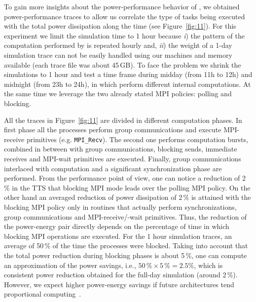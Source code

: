 To gain more insights about the power-performance behavior of \cosmoart, we obtained power-per\-for\-man\-ce traces to allow us correlate the type of tasks being executed with the total power dissipation along the time (see Figure~\ref{fig:11}). For this experiment we limit the simulation time to 1 hour because \emph{i}) the pattern of the computation performed by \cosmoart is repeated hourly and, \emph{ii}) the weight of a 1-day simulation trace can not be easily handled using our machines and memory available (each trace file was about 45\,GB). To face the problem we shrink the simulations to 1 hour and test a time frame during midday (from 11h to 12h) and  midnight (from 23h to 24h), in which \cosmoart perform different internal computations. At the same time we leverage the two already stated MPI policies: polling and blocking. 

All the traces in Figure~\ref{fig:11} are divided in different computation phases. In first phase all the processes perform group communications and execute MPI-receive primitives (e.g. \texttt{MPI\_Recv}). The second one performs computation bursts, combined in between with group communications, blocking sends, immediate receives and MPI-wait primitives are executed. Finally, group communications interlaced with computation and a significant synchronization phase are performed. From the performance point of view, one can notice a reduction of 2\,\% in the TTS that blocking MPI mode leads over the polling MPI policy. On the other hand an averaged reduction of power dissipation of 2\,\% is attained with the blocking MPI policy only in routines that actually perform synchronizations, group communications and MPI-receive/-wait primitives. Thus, the reduction of the power-energy pair directly depends on the percentage of time in which blocking MPI operations are executed. For the 1 hour simulation traces, an average of 50\,\% of the time the processes were blocked. Taking into account that  the total power reduction during blocking phases is about 5\,\%, one can compute an approximation of the power savings, i.e., $50\,\% \times 5\,\% = 2.5\%$, which is consistent power reduction obtained for the full-day simulation (around 2\,\%). However, we expect higher power-energy savings if future architectures tend proportional computing~\citep{Barroso:2007:CEC:1339817.1339894}.








